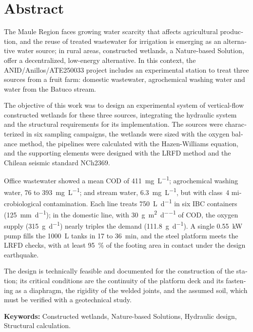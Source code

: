 \chapter*{Abstract}
\begin{otherlanguage}{english}
The Maule Region faces growing water scarcity that affects agricultural production, and the reuse of treated wastewater for irrigation is emerging as an alternative water source; in rural areas, constructed wetlands, a Nature-based Solution, offer a decentralized, low-energy alternative.
In this context, the ANID/Anillos/ATE250033 project includes an experimental station to treat three sources from a fruit farm: domestic wastewater, agrochemical washing water and water from the Batuco stream.

The objective of this work was to design an experimental system of vertical-flow constructed wetlands for these three sources, integrating the hydraulic system and the structural requirements for its implementation.
The sources were characterized in six sampling campaigns, the wetlands were sized with the oxygen balance method, the pipelines were calculated with the Hazen-Williams equation, and the supporting elements were designed with the LRFD method and the Chilean seismic standard NCh2369.

Office wastewater showed a mean COD of \qty{411}{\milli\gram\per\liter}; agrochemical washing water, 76 to \qty{393}{\milli\gram\per\liter}; and stream water, \qty{6.3}{\milli\gram\per\liter}, but with class~4 microbiological contamination.
Each line treats \qty{750}{\liter\per\day} in six IBC containers (\qty{125}{\milli\meter\per\day}); in the domestic line, with \qty{30}{\gram\per\square\meter\per\day} of COD, the oxygen supply (\qty{315}{\gram\per\day}) nearly triples the demand (\qty{111.8}{\gram\per\day}).
A single \qty{0.55}{\kilo\watt} pump fills the \qty{1000}{\liter} tanks in 17 to \qty{36}{\minute}, and the steel platform meets the LRFD checks, with at least \qty{95}{\percent} of the footing area in contact under the design earthquake.

The design is technically feasible and documented for the construction of the station; its critical conditions are the continuity of the platform deck and its fastening as a diaphragm, the rigidity of the welded joints, and the assumed soil, which must be verified with a geotechnical study.

\noindent\textbf{Keywords:} Constructed wetlands, Nature-based Solutions, Hydraulic design, Structural calculation.
\end{otherlanguage}
